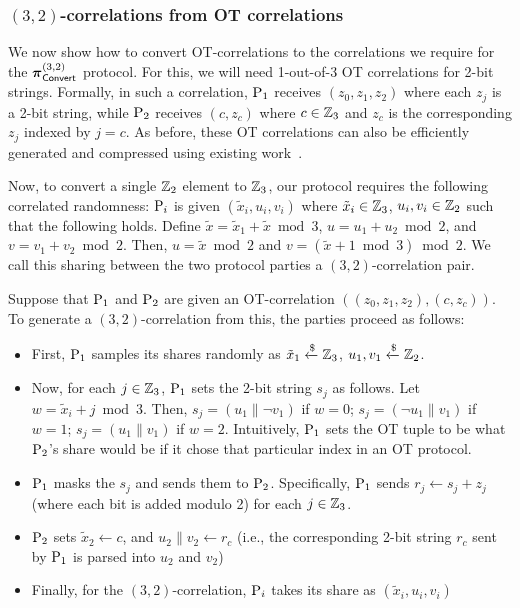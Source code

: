 \subsubsection{$(3,2)$-correlations from OT correlations}

We now show how to convert OT-correlations to the correlations we require for the $\boldsymbol{\pi}_{\textnormal{\textsf{Convert}}}^{(3,2)}$ protocol. For this, we will need 1-out-of-3 OT correlations for 2-bit strings. Formally, in such a correlation, $\textnormal{P}_1$ receives $(z_0, z_1, z_2)$ where each $z_j$ is a 2-bit string, while $\textnormal{P}_2$ receives $(c, z_c)$ where $c \in \mathbb{Z}_3$ and $z_c$ is the corresponding $z_j$ indexed by $j = c$. As before, these OT correlations can also be efficiently generated and compressed using existing work~\cite{??}.

Now, to convert a single $\mathbb{Z}_2$ element to $\mathbb{Z}_3$, our protocol requires the following correlated randomness: $\textnormal{P}_i$ is given $(\tilde{x}_i, u_i, v_i)$ where $\tilde{x}_i \in \mathbb{Z}_3$, $u_i,v_i \in \mathbb{Z}_2$ such that the following holds. Define $\tilde{x} = \tilde{x}_1 + \tilde{x} \bmod 3$, $u = u_1 + u_2 \bmod 2$, and $v = v_1 + v_2 \bmod 2$. Then, $u = \tilde{x} \bmod 2$ and $v = (\tilde{x} + 1 \bmod 3) \bmod 2$. We call this sharing between the two protocol parties a $(3,2)$-correlation pair.

Suppose that $\textnormal{P}_1$ and $\textnormal{P}_2$ are given an OT-correlation $((z_0,z_1,z_2), (c,z_c))$. To generate a $(3,2)$-correlation from this, the parties proceed as follows:
\begin{itemize}[topsep=0pt]
  \item First, $\textnormal{P}_1$ samples its shares randomly as $\tilde{x}_1 \xleftarrow{\$} \mathbb{Z}_3$, $u_1, v_1 \xleftarrow{\$} \mathbb{Z}_2$.
  \item Now, for each $j \in \mathbb{Z}_3$, $\textnormal{P}_1$ sets the 2-bit string $s_j$ as follows. Let $w = \tilde{x}_i + j \bmod 3$. Then, $s_j = (u_1 \parallel \neg v_1)$ if $w = 0$; $s_j = (\neg u_1 \parallel v_1)$ if $w = 1$; $s_j = (u_1 \parallel v_1)$ if $w = 2$. Intuitively, $\textnormal{P}_1$ sets the OT tuple to be what $\textnormal{P}_2$'s share would be if it chose that particular index in an OT protocol.
  \item $\textnormal{P}_1$ masks the $s_j$ and sends them to $\textnormal{P}_2$. Specifically, $\textnormal{P}_1$ sends $r_j \gets s_j + z_j$ (where each bit is added modulo 2) for each $j \in \mathbb{Z}_3$.

  \item $\textnormal{P}_2$ sets $\tilde{x}_2 \gets c$, and $u_2 \parallel v_2 \gets r_c$ (i.e., the corresponding 2-bit string $r_c$ sent by $\textnormal{P}_1$ is parsed into $u_2$ and $v_2$)

  \item Finally, for the $(3,2)$-correlation, $\textnormal{P}_i$ takes its share as $(\tilde{x}_i, u_i, v_i)$
  \end{itemize}

